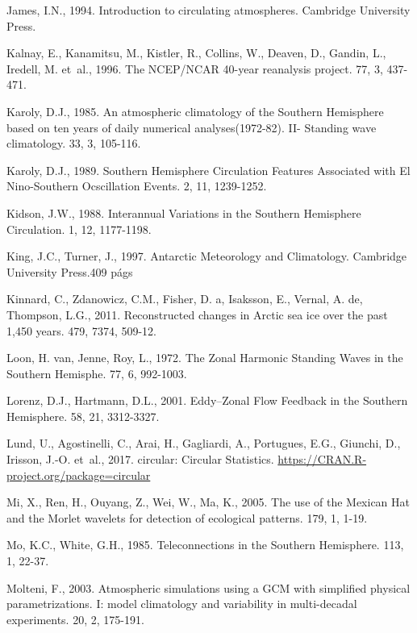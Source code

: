 \documentclass[spanish,a4paper,12pt]{book}
\begin{document}
\hypertarget{ref-James}{}
James, I.N., 1994. Introduction to circulating atmospheres. Cambridge
University Press.

\hypertarget{ref-Kalnay1996}{}
Kalnay, E., Kanamitsu, M., Kistler, R., Collins, W., Deaven, D., Gandin,
L., Iredell, M. et~al., 1996. The NCEP/NCAR 40-year reanalysis project.
77, 3, 437-471.

\hypertarget{ref-Karoly1985}{}
Karoly, D.J., 1985. An atmospheric climatology of the Southern
Hemisphere based on ten years of daily numerical analyses(1972-82). II-
Standing wave climatology. 33, 3, 105-116.

\hypertarget{ref-Karoly1989}{}
Karoly, D.J., 1989. Southern Hemisphere Circulation Features Associated
with El Nino-Southern Ocscillation Events. 2, 11, 1239-1252.

\hypertarget{ref-Kidson1988}{}
Kidson, J.W., 1988. Interannual Variations in the Southern Hemisphere
Circulation. 1, 12, 1177-1198.

\hypertarget{ref-King1997}{}
King, J.C., Turner, J., 1997. Antarctic Meteorology and Climatology.
Cambridge University Press.409 págs

\hypertarget{ref-Kinnard2011}{}
Kinnard, C., Zdanowicz, C.M., Fisher, D. a, Isaksson, E., Vernal, A. de,
Thompson, L.G., 2011. Reconstructed changes in Arctic sea ice over the
past 1,450 years. 479, 7374, 509-12.

\hypertarget{ref-Loon1972}{}
Loon, H. van, Jenne, Roy, L., 1972. The Zonal Harmonic Standing Waves in
the Southern Hemisphe. 77, 6, 992-1003.

\hypertarget{ref-Lorenz2001}{}
Lorenz, D.J., Hartmann, D.L., 2001. Eddy--Zonal Flow Feedback in the
Southern Hemisphere. 58, 21, 3312-3327.

\hypertarget{ref-R-circular}{}
Lund, U., Agostinelli, C., Arai, H., Gagliardi, A., Portugues, E.G.,
Giunchi, D., Irisson, J.-O. et~al., 2017. circular: Circular Statistics.
\url{https://CRAN.R-project.org/package=circular}

\hypertarget{ref-Mi2005}{}
Mi, X., Ren, H., Ouyang, Z., Wei, W., Ma, K., 2005. The use of the
Mexican Hat and the Morlet wavelets for detection of ecological
patterns. 179, 1, 1-19.

\hypertarget{ref-Mo1985}{}
Mo, K.C., White, G.H., 1985. Teleconnections in the Southern Hemisphere.
113, 1, 22-37.

\hypertarget{ref-Molteni2003}{}
Molteni, F., 2003. Atmospheric simulations using a GCM with simplified
physical parametrizations. I: model climatology and variability in
multi-decadal experiments. 20, 2, 175-191.
\end{document}
